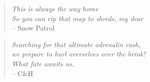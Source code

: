 
%
%

\cleardoublepage

\thispagestyle{empty}
\vspace*{5cm} 
\begin{quote} 
	\begin{flushright}
	
		\textit{This is always the way home}\\
		\textit{So you can rip that map to shreds, my dear}\\
		-- Snow Patrol
		
	\end{flushright}
\end{quote}
\vspace*{1cm} 
\begin{quote} 
	\begin{flushright}
		
		\textit{Searching for that ultimate adrenalin rush,}\\
		\textit{we prepare to hurl overselves over the brink!}\\
		\textit{What fate awaits us.}\\		
		-- C\&H
		
	\end{flushright}
\end{quote}


\cleardoublepage



